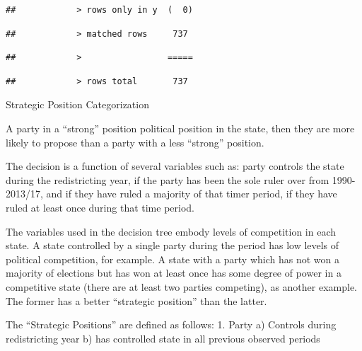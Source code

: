\documentclass[
]{article}
\begin{document}
\begin{verbatim}
##            > rows only in y  (  0)
\end{verbatim}

\begin{verbatim}
##            > matched rows     737
\end{verbatim}

\begin{verbatim}
##            >                 =====
\end{verbatim}

\begin{verbatim}
##            > rows total       737
\end{verbatim}

Strategic Position Categorization

A party in a ``strong'' position political position in the state, then
they are more likely to propose than a party with a less ``strong''
position.

The decision is a function of several variables such as: party controls
the state during the redistricting year, if the party has been the sole
ruler over from 1990-2013/17, and if they have ruled a majority of that
timer period, if they have ruled at least once during that time period.

The variables used in the decision tree embody levels of competition in
each state. A state controlled by a single party during the period has
low levels of political competition, for example. A state with a party
which has not won a majority of elections but has won at least once has
some degree of power in a competitive state (there are at least two
parties competing), as another example. The former has a better
``strategic position'' than the latter.

The ``Strategic Positions'' are defined as follows: 1. Party a) Controls
during redistricting year b) has controlled state in all previous
observed periods
\end{document}
